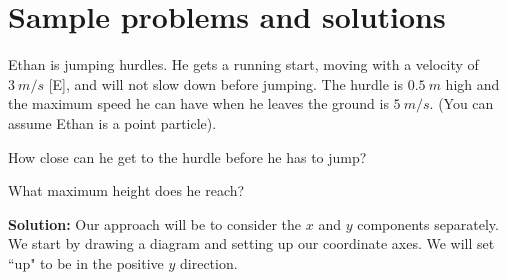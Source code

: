 \section{Sample problems and solutions}
\begin{problemParts}{Ethan is jumping hurdles. He gets a running start, moving with a velocity of $\SI{3}{m/s}$ [E], and will not slow down before jumping. The hurdle is $\SI{0.5}{m}$ high and the maximum speed he can have when he leaves the ground is $\SI{5}{m/s}$. (You can assume Ethan is a point particle).}
\item How close can he get to the hurdle before he has to jump?
\item What maximum height does he reach?
\end{problemParts}
\textbf{Solution:}
Our approach will be to consider the $x$ and $y$ components separately. We start by drawing a diagram and setting up our coordinate axes. We will set ``up" to be in the positive $y$ direction.
